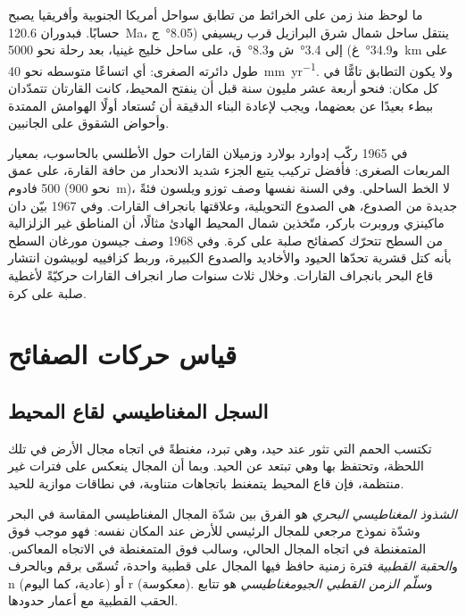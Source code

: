 ما لوحظ منذ زمن على الخرائط من تطابق سواحل أمريكا الجنوبية وأفريقيا يصبح حسابًا. فبدوران \qty{120.6}{Ma}، ينتقل ساحل شمال شرق البرازيل قرب ريسيفي (\ang{8.05}~ج و\ang{34.9}~غ) إلى \ang{3.4}~ش و\ang{8.3}~ق، على ساحل خليج غينيا، بعد رحلة نحو \qty{5000}{km} على طول دائرته الصغرى: أي اتساعًا متوسطه نحو \qty{40}{mm.yr^{-1}}. ولا يكون التطابق تامًّا في كل مكان: فنحو أربعة عشر مليون سنة قبل أن ينفتح المحيط، كانت القارتان تتمدّدان ببطء بعيدًا عن بعضهما، ويجب لإعادة البناء الدقيقة أن تُستعاد أولًا الهوامش الممتدة وأحواض الشقوق على الجانبين.

\begin{history}
في 1965 ركّب إدوارد بولارد وزميلان القارات حول الأطلسي بالحاسوب، بمعيار المربعات الصغرى: فأفضل تركيب يتبع الجزء شديد الانحدار من حافة القارة، على عمق 500 فادوم (نحو \qty{900}{m})، لا الخط الساحلي. وفي السنة نفسها وصف توزو ويلسون فئةً جديدة من الصدوع، هي الصدوع التحويلية، وعلاقتها بانجراف القارات. وفي 1967 بيّن دان ماكينزي وروبرت باركر، متّخذين شمال المحيط الهادئ مثالًا، أن المناطق غير الزلزالية من السطح تتحرّك كصفائح صلبة على كرة. وفي 1968 وصف جيسون مورغان السطح بأنه كتل قشرية تحدّها الحيود والأخاديد والصدوع الكبيرة، وربط كزافييه لوبيشون انتشار قاع البحر بانجراف القارات. وخلال ثلاث سنوات صار انجراف القارات حركيّةً لأغطية صلبة على كرة.
\end{history}

\section{قياس حركات الصفائح}

\subsection*{السجل المغناطيسي لقاع المحيط}

تكتسب الحمم التي تثور عند حيد، وهي تبرد، مغنطةً في اتجاه مجال الأرض في تلك اللحظة، وتحتفظ بها وهي تبتعد عن الحيد. وبما أن المجال ينعكس على فترات غير منتظمة، فإن قاع المحيط يتمغنط باتجاهات متناوبة، في نطاقات موازية للحيد.

\begin{definition}\label{def:b1:plate-kinematics:magnetic-anomaly}
\emph{الشذوذ المغناطيسي البحري} هو الفرق بين شدّة المجال المغناطيسي المقاسة في البحر وشدّة نموذج مرجعي للمجال الرئيسي للأرض عند المكان نفسه: فهو موجب فوق  المتمغنطة في اتجاه المجال الحالي، وسالب فوق  المتمغنطة في الاتجاه المعاكس. و\emph{الحقبة القطبية} فترة زمنية حافظ فيها المجال على قطبية واحدة، تُسمّى برقم وبالحرف n (عادية، كما اليوم) أو r (معكوسة). و\emph{سلّم الزمن القطبي الجيومغناطيسي} هو تتابع الحقب القطبية مع أعمار حدودها.
\end{definition}

